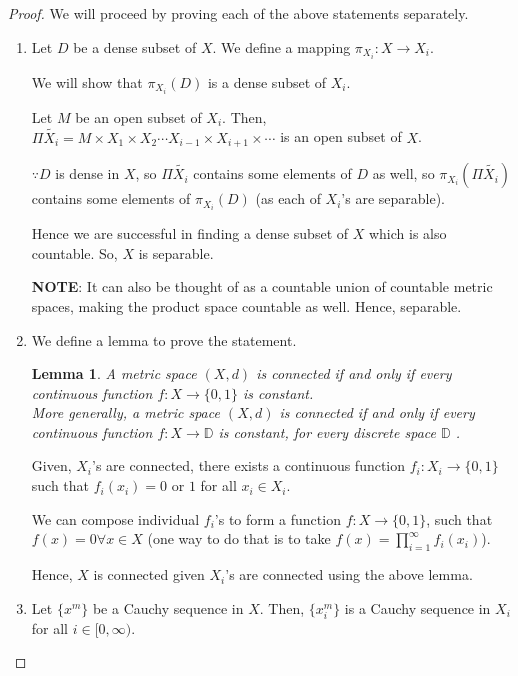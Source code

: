 \documentclass[12pt]{article}
\let\bold\textbf
\newtheorem{lemma}{Lemma}[section]
\begin{document}
\begin{proof}
    We will proceed by proving each of the above statements separately.
    \begin{enumerate}
        \vspace{0.2cm}
        \item {
            Let $D$ be a dense subset of $X$. We define a mapping $\pi_{X_i}: X \to X_i$.

            We will show that $\pi_{X_i}(D)$ is a dense subset of $X_i$.
            
            Let $M$ be an open subset of $X_i$. Then, $\Pi \tilde{X_i} = M \times X_1 \times X_2 \dotsb X_{i-1} \times X_{i+1} \times \dotsb$ is an open subset of $X$.

            $\because D$ is dense in $X$, so $\Pi \tilde{X_i}$ contains some elements of $D$ as well, so $\pi_{X_i}(\Pi \tilde{X_i})$ contains some elements of $\pi_{X_i}(D)$ (as each of $X_i$'s are separable).

            Hence we are successful in finding a dense subset of $X$ which is also countable. So, $X$ is separable.

            \bold{NOTE}: It can also be thought of as a countable union of countable metric spaces, making the product space countable as well. Hence, separable.
        }
        \vspace{0.2cm}
        \item { We define a lemma to prove the statement.
            \begin{lemma}
                A metric space $(X, d)$ is connected if and only if every continuous function $f: X \to \{0, 1\}$ is constant. \\
                More generally, a metric space $(X, d)$ is connected if and only if every continuous function $f: X \to \mathbb{D}$ is constant, for every discrete space $\mathbb{D}$ \cite{3919752}.
            \end{lemma}
            Given, $X_i$'s are connected, there exists a continuous function $f_i: X_i \to \{0, 1\}$ such that $f_i(x_i) = 0$ or $1$ for all $x_i \in X_i$.

            We can compose individual $f_i$'s to form a function $f: X \to \{0, 1\}$, such that $f(x) = 0 \forall x \in X$ (one way to do that is to take $f(x) = \prod_{i=1}^{\infty} f_i(x_i)$).
            
            Hence, $X$ is connected given $X_i$'s are connected using the above lemma.
        }
        \vspace{0.2cm}
        \item {
            Let $\{x^m\}$ be a Cauchy sequence in $X$. Then, $\{x^m_i\}$ is a Cauchy sequence in $X_i$ for all $i \in [0, \infty)$. 
            
}
\end{enumerate}
\end{proof}
\end{document}
